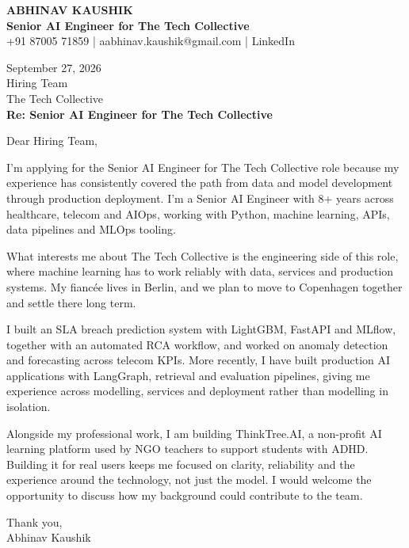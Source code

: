 \documentclass[10pt,a4paper]{article}
\begin{document}
\begin{center}
{\Large\bfseries ABHINAV KAUSHIK}\\[2pt]
{\bfseries Senior AI Engineer for The Tech Collective}\\[2pt]
+91 87005 71859 \quad | \quad aabhinav.kaushik@gmail.com \quad | \quad LinkedIn
\end{center}
\vspace{8pt}
September 27, 2026\\[6pt]
Hiring Team\\
The Tech Collective\\[4pt]
\textbf{Re: Senior AI Engineer for The Tech Collective}

Dear Hiring Team,

I’m applying for the Senior AI Engineer for The Tech Collective role because my experience has consistently covered the path from data and model development through production deployment. I’m a Senior AI Engineer with 8+ years across healthcare, telecom and AIOps, working with Python, machine learning, APIs, data pipelines and MLOps tooling.

What interests me about The Tech Collective is the engineering side of this role, where machine learning has to work reliably with data, services and production systems. My fiancée lives in Berlin, and we plan to move to Copenhagen together and settle there long term.

I built an SLA breach prediction system with LightGBM, FastAPI and MLflow, together with an automated RCA workflow, and worked on anomaly detection and forecasting across telecom KPIs. More recently, I have built production AI applications with LangGraph, retrieval and evaluation pipelines, giving me experience across modelling, services and deployment rather than modelling in isolation.

Alongside my professional work, I am building ThinkTree.AI, a non-profit AI learning platform used by NGO teachers to support students with ADHD. Building it for real users keeps me focused on clarity, reliability and the experience around the technology, not just the model. I would welcome the opportunity to discuss how my background could contribute to the team.

Thank you,\\
Abhinav Kaushik
\end{document}
